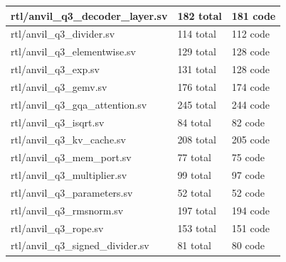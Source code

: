 \documentclass[11pt,a4paper]{article}
\begin{document}
{\begin{longtable}{@{}L{0.55\textwidth}|L{0.18\textwidth}|L{0.18\textwidth}@{}}
rtl/\allowbreak{}anvil\_\allowbreak{}q3\_\allowbreak{}decoder\_\allowbreak{}layer.sv & 182 total & 181 code\\[2pt]\hline

rtl/\allowbreak{}anvil\_\allowbreak{}q3\_\allowbreak{}divider.sv & 114 total & 112 code\\[2pt]\hline

rtl/\allowbreak{}anvil\_\allowbreak{}q3\_\allowbreak{}elementwise.sv & 129 total & 128 code\\[2pt]\hline

rtl/\allowbreak{}anvil\_\allowbreak{}q3\_\allowbreak{}exp.sv & 131 total & 128 code\\[2pt]\hline

rtl/\allowbreak{}anvil\_\allowbreak{}q3\_\allowbreak{}gemv.sv & 176 total & 174 code\\[2pt]\hline

rtl/\allowbreak{}anvil\_\allowbreak{}q3\_\allowbreak{}gqa\_\allowbreak{}attention.sv & 245 total & 244 code\\[2pt]\hline

rtl/\allowbreak{}anvil\_\allowbreak{}q3\_\allowbreak{}isqrt.sv & 84 total & 82 code\\[2pt]\hline

rtl/\allowbreak{}anvil\_\allowbreak{}q3\_\allowbreak{}kv\_\allowbreak{}cache.sv & 208 total & 205 code\\[2pt]\hline

rtl/\allowbreak{}anvil\_\allowbreak{}q3\_\allowbreak{}mem\_\allowbreak{}port.sv & 77 total & 75 code\\[2pt]\hline

rtl/\allowbreak{}anvil\_\allowbreak{}q3\_\allowbreak{}multiplier.sv & 99 total & 97 code\\[2pt]\hline

rtl/\allowbreak{}anvil\_\allowbreak{}q3\_\allowbreak{}parameters.sv & 52 total & 52 code\\[2pt]\hline

rtl/\allowbreak{}anvil\_\allowbreak{}q3\_\allowbreak{}rmsnorm.sv & 197 total & 194 code\\[2pt]\hline

rtl/\allowbreak{}anvil\_\allowbreak{}q3\_\allowbreak{}rope.sv & 153 total & 151 code\\[2pt]\hline

rtl/\allowbreak{}anvil\_\allowbreak{}q3\_\allowbreak{}signed\_\allowbreak{}divider.sv & 81 total & 80 code\\[2pt]\hline


\end{longtable}}
\end{document}
